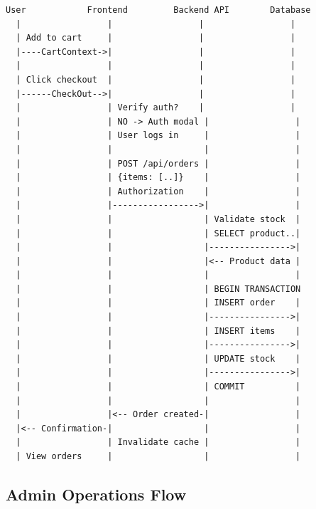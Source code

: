 \documentclass[12pt,a4paper]{report}
\begin{document}
\begin{lstlisting}[language=text, caption=Complete Order Creation Process]
User            Frontend         Backend API        Database
  |                 |                 |                 |
  | Add to cart     |                 |                 |
  |----CartContext->|                 |                 |
  |                 |                 |                 |
  | Click checkout  |                 |                 |
  |------CheckOut-->|                 |                 |
  |                 | Verify auth?    |                 |
  |                 | NO -> Auth modal |                 |
  |                 | User logs in     |                 |
  |                 |                  |                 |
  |                 | POST /api/orders |                 |
  |                 | {items: [..]}    |                 |
  |                 | Authorization    |                 |
  |                 |----------------->|                 |
  |                 |                  | Validate stock  |
  |                 |                  | SELECT product..|
  |                 |                  |---------------->|
  |                 |                  |<-- Product data |
  |                 |                  |                 |
  |                 |                  | BEGIN TRANSACTION
  |                 |                  | INSERT order    |
  |                 |                  |---------------->|
  |                 |                  | INSERT items    |
  |                 |                  |---------------->|
  |                 |                  | UPDATE stock    |
  |                 |                  |---------------->|
  |                 |                  | COMMIT          |
  |                 |                  |                 |
  |                 |<-- Order created-|                 |
  |<-- Confirmation-|                  |                 |
  |                 | Invalidate cache |                 |
  | View orders     |                  |                 |
\end{lstlisting}

\subsection{Admin Operations Flow}
\end{document}
